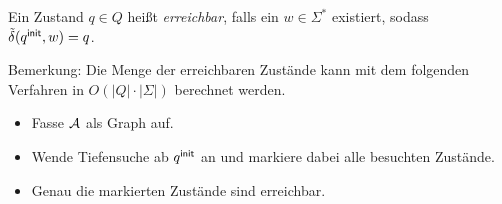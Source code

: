 \begin{Def}
  Ein Zustand $q \in Q$ heißt \emph{erreichbar}, falls ein $w \in \Sigma^*$ existiert, sodass $\tilde \delta(q^\mathsf{init}, w) = q$.
\end{Def}
Bemerkung: Die Menge der erreichbaren Zustände kann mit dem folgenden Verfahren in $O(|Q|\cdot|\Sigma|)$ berechnet werden.
  \begin{itemize}
  \item Fasse $\mathcal{A}$ als Graph auf.
  \item Wende Tiefensuche ab $q^\mathsf{init}$ an und markiere dabei alle besuchten Zustände.
  \item Genau die markierten Zustände sind erreichbar.
  \end{itemize}



